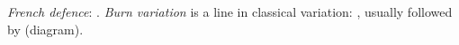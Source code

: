 \emph{French defence}: .
\emph{Burn variation} is a line in classical variation: , usually followed by  (diagram).